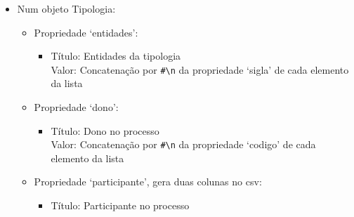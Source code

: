 \begin{itemize}
\begin{itemize}
\begin{itemize}
            \item Propriedade `participante', gera duas colunas no \acrshort{csv}:
            \begin{itemize}
                \item Título: Participante no processo \\
                      Valor: Concatenação por \verb|#\n| da propriedade `codigo' de cada elemento da lista
                \item Título: Tipo de intervenção no processo \\
                      Valor: Concatenação por \verb|#\n| da propriedade `tipoPar' de cada elemento da lista
            \end{itemize}
            \item Propriedade `tipologias':
            \begin{itemize}
                \item Título: Tipologias da entidade \\
                      Valor: Concatenação por \verb|#\n| da propriedade `sigla' de cada elemento da lista
            \end{itemize}
        \end{itemize}
        \item Num objeto Tipologia:
        \begin{itemize}
            \item Propriedade `entidades':
            \begin{itemize}
                \item Título: Entidades da tipologia \\
                      Valor: Concatenação por \verb|#\n| da propriedade `sigla' de cada elemento da lista
            \end{itemize}
            \item Propriedade `dono':
            \begin{itemize}
                \item Título: Dono no processo \\
                      Valor: Concatenação por \verb|#\n| da propriedade `codigo' de cada elemento da lista
            \end{itemize}
            \item Propriedade `participante', gera duas colunas no \acrshort{csv}:
            \begin{itemize}
                \item Título: Participante no processo \\

\end{itemize}
\end{itemize}
\end{itemize}
\end{itemize}

